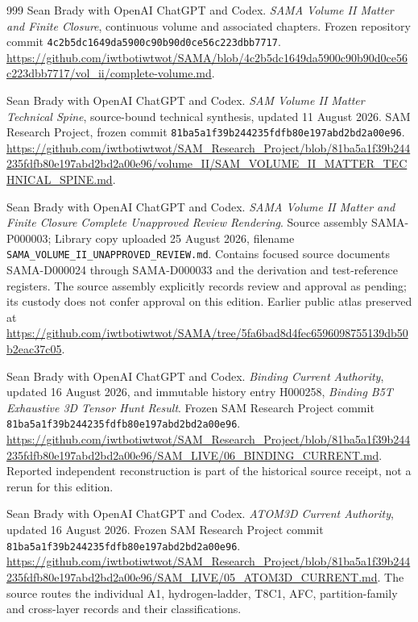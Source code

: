 \begin{thebibliography}{999}
Sean Brady with OpenAI ChatGPT and Codex.
\emph{SAMA Volume II Matter and Finite Closure}, continuous volume and associated chapters.
Frozen repository commit \nolinkurl{4c2b5dc1649da5900c90b90d0ce56c223dbb7717}.
\url{https://github.com/iwtbotiwtwot/SAMA/blob/4c2b5dc1649da5900c90b90d0ce56c223dbb7717/vol_ii/complete-volume.md}.

Sean Brady with OpenAI ChatGPT and Codex.
\emph{SAM Volume II Matter Technical Spine}, source-bound technical synthesis, updated 11 August 2026.
SAM Research Project, frozen commit \nolinkurl{81ba5a1f39b244235fdfb80e197abd2bd2a00e96}.
\url{https://github.com/iwtbotiwtwot/SAM_Research_Project/blob/81ba5a1f39b244235fdfb80e197abd2bd2a00e96/volume_II/SAM_VOLUME_II_MATTER_TECHNICAL_SPINE.md}.

Sean Brady with OpenAI ChatGPT and Codex.
\emph{SAMA Volume II Matter and Finite Closure Complete Unapproved Review Rendering}.
Source assembly SAMA-P000003; Library copy uploaded 25 August 2026, filename \texttt{SAMA\_VOLUME\_II\_UNAPPROVED\_REVIEW.md}.
Contains focused source documents SAMA-D000024 through SAMA-D000033 and the derivation and test-reference registers.
The source assembly explicitly records review and approval as pending; its custody does not confer approval on this edition.
Earlier public atlas preserved at
\url{https://github.com/iwtbotiwtwot/SAMA/tree/5fa6bad8d4fec6596098755139db50b2eac37c05}.

Sean Brady with OpenAI ChatGPT and Codex.
\emph{Binding Current Authority}, updated 16 August 2026, and immutable history entry H000258, \emph{Binding B5T Exhaustive 3D Tensor Hunt Result}.
Frozen SAM Research Project commit \nolinkurl{81ba5a1f39b244235fdfb80e197abd2bd2a00e96}.
\url{https://github.com/iwtbotiwtwot/SAM_Research_Project/blob/81ba5a1f39b244235fdfb80e197abd2bd2a00e96/SAM_LIVE/06_BINDING_CURRENT.md}.
Reported independent reconstruction is part of the historical source receipt, not a rerun for this edition.

Sean Brady with OpenAI ChatGPT and Codex.
\emph{ATOM3D Current Authority}, updated 16 August 2026.
Frozen SAM Research Project commit \nolinkurl{81ba5a1f39b244235fdfb80e197abd2bd2a00e96}.
\url{https://github.com/iwtbotiwtwot/SAM_Research_Project/blob/81ba5a1f39b244235fdfb80e197abd2bd2a00e96/SAM_LIVE/05_ATOM3D_CURRENT.md}.
The source routes the individual A1, hydrogen-ladder, T8C1, AFC, partition-family and cross-layer records and their classifications.


\end{thebibliography}
